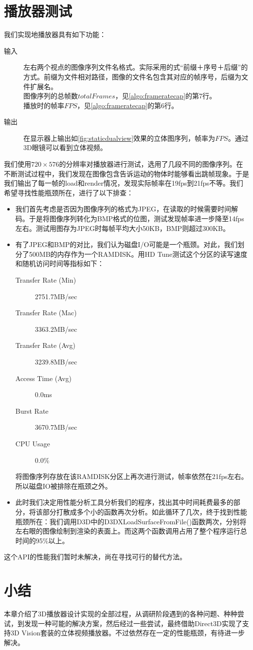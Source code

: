 \section{播放器测试}
\label{sec:3dplayerdemo}

我们实现地播放器具有如下功能：
\begin{description}
\item[输入] 左右两个视点的图像序列文件名格式。实际采用的式“前缀＋序号＋后缀”的方式。前缀为文件相对路径，图像的文件名包含其对应的帧序号，后缀为文件扩展名。\\
	图像序列的总帧数$totalFrames$，见\autoref{algo:frameratecap}的第7行。\\
	播放时的帧率$FPS$，见\autoref{algo:frameratecap}的第6行。
\item[输出] 在显示器上输出如\autoref{fig:staticdualview}效果的立体图序列，帧率为$FPS$。通过3D眼镜可以看到立体视频。
\end{description}


我们使用$720\times576$的分辨率对播放器进行测试，选用了几段不同的图像序列。在不断测试过程中，我们发现在图像包含告诉运动的物体时能够看出跳帧现象。于是我们输出了每一帧的load和render情况，发现实际帧率在19fps到21fps不等。我们希望寻找性能瓶颈所在，进行了以下排查：
\begin{itemize}
\item 我们首先考虑是否因为图像序列的格式为JPEG，在读取的时候需要时间解码。于是将图像序列转化为BMP格式的位图，测试发现帧率进一步降至14fps左右。测试用图存为JPEG时每帧平均大小50KB，BMP则超过300KB。
\item 有了JPEG和BMP的对比，我们认为磁盘I/O可能是一个瓶颈。对此，我们划分了500MB的内存作为一个RAMDISK。用HD Tune测试这个分区的读写速度和随机访问时间等指标如下：
\begin{description}
\item[Transfer Rate (Min)] 2751.7MB/sec
\item[Transfer Rate (Mac)] 3363.2MB/sec
\item[Transfer Rate (Avg)] 3239.8MB/sec
\item[Access Time (Avg)] 0.0ms
\item[Burst Rate] 3670.7MB/sec
\item[CPU Usage] 0.0\%
\end{description}
将图像序列存放在该RAMDISK分区上再次进行测试，帧率依然在21fps左右。所以磁盘IO被排除在瓶颈之外。
\item 此时我们决定用性能分析工具分析我们的程序，找出其中时间耗费最多的部分，将该部分打散成多个小的函数再次分析。如此循环了几次，终于找到性能瓶颈所在：我们调用D3D中的D3DXLoadSurfaceFromFile()函数两次，分别将左右眼的图像绘制到渲染的表面上。而这两个函数调用占用了整个程序运行总时间的95\%以上。
\end{itemize}
这个API的性能我们暂时未解决，尚在寻找可行的替代方法。


\section{小结}
\label{sec:sum7}

本章介绍了3D播放器设计实现的全部过程，从调研阶段遇到的各种问题、种种尝试，到发现一种可能的解决方案，然后经过一些尝试，最终借助Direct3D实现了支持3D Vision套装的立体视频播放器。不过依然存在一定的性能瓶颈，有待进一步解决。

\cleardoublepage